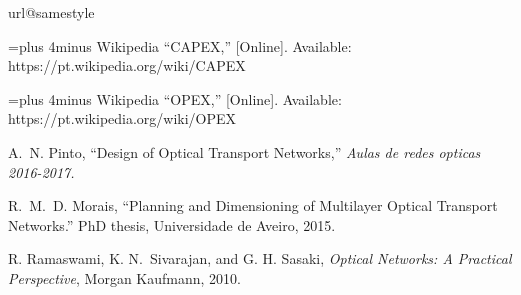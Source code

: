 {}
%
\renewcommand{\bibname}{References}
%
%
%
%
\begin{thebibliography}{10}
\providecommand{\url}[1]{#1}
\csname url@samestyle\endcsname
\providecommand{\newblock}{\relax}
\providecommand{\bibinfo}[2]{#2}
\providecommand{\BIBentrySTDinterwordspacing}{\spaceskip=0pt\relax}
\providecommand{\BIBentryALTinterwordstretchfactor}{4}
\providecommand{\BIBentryALTinterwordspacing}{\spaceskip=\fontdimen2\font plus
\BIBentryALTinterwordstretchfactor\fontdimen3\font minus
  \fontdimen4\font\relax}
\providecommand{\BIBforeignlanguage}[2]{{%
\expandafter\ifx\csname l@#1\endcsname\relax
\typeout{** WARNING: IEEEtran.bst: No hyphenation pattern has been}%
\typeout{** loaded for the language `#1'. Using the pattern for}%
\typeout{** the default language instead.}%
\else
\language=\csname l@#1\endcsname
\fi
#2}}
\providecommand{\BIBdecl}{\relax}
\BIBdecl

\BIBentryALTinterwordspacing
Wikipedia ``CAPEX,'' [Online]. Available: \url{https://pt.wikipedia.org/wiki/CAPEX}
\BIBentrySTDinterwordspacing

\BIBentryALTinterwordspacing
Wikipedia ``OPEX,'' [Online]. Available: \url{https://pt.wikipedia.org/wiki/OPEX}
\BIBentrySTDinterwordspacing

A.~N. Pinto, ``Design of Optical Transport Networks,'' \emph{Aulas de redes opticas 2016-2017.}

R.~M.~D. Morais, ``Planning and Dimensioning of Multilayer Optical Transport Networks.'' PhD thesis, Universidade de Aveiro, 2015.

R. Ramaswami, K. N.~Sivarajan, and G. H. Sasaki, \emph{Optical Networks: A Practical Perspective}, Morgan Kaufmann, 2010.

\end{thebibliography} 